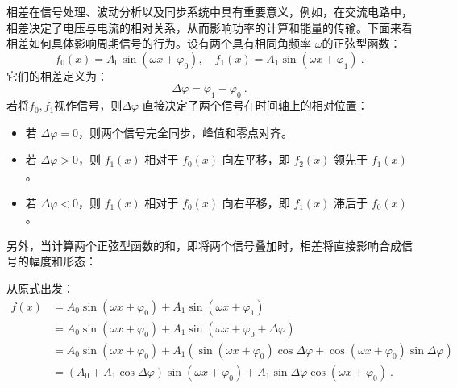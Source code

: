 相差在信号处理、波动分析以及同步系统中具有重要意义，例如，在交流电路中，相差决定了电压与电流的相对关系，从而影响功率的计算和能量的传输。下面来看相差如何具体影响周期信号的行为。设有两个具有相同角频率 $\omega$的正弦型函数：
\begin{equation}
f_0\left(x\right)=A_0\sin\left(\omega x+\varphi_0\right),\quad f_1\left(x\right)=A_1\sin\left(\omega x+\varphi_1\right)~.
\end{equation}
它们的相差定义为：
\begin{equation}
\Delta \varphi = \varphi_1 - \varphi_0~.
\end{equation}
若将$f_0,f_1$视作信号，则$\Delta \varphi$ 直接决定了两个信号在时间轴上的相对位置：
\begin{itemize}
\item 若 $\Delta \varphi = 0$，则两个信号完全同步，峰值和零点对齐。
\item 若 $\Delta \varphi > 0$，则 $f_1(x)$ 相对于 $f_0(x)$ 向左平移，即 $f_2(x)$ 领先于 $f_1(x)$。
\item 若 $\Delta \varphi < 0$，则 $f_1(x)$ 相对于 $f_0(x)$ 向右平移，即 $f_1(x)$ 滞后于 $f_0(x)$。
\end{itemize}

另外，当计算两个正弦型函数的和，即将两个信号叠加时，相差将直接影响合成信号的幅度和形态：

从原式出发：
\begin{equation}
\begin{split}
f(x) &= A_0\sin(\omega x + \varphi_0) + A_1\sin(\omega x + \varphi_1) \\
&= A_0\sin(\omega x + \varphi_0) + A_1\sin(\omega x + \varphi_0 + \Delta \varphi)\\
&= A_0\sin(\omega x + \varphi_0) + A_1 \left( \sin(\omega x + \varphi_0) \cos \Delta \varphi + \cos(\omega x + \varphi_0) \sin \Delta \varphi \right) \\
&= (A_0 + A_1 \cos \Delta \varphi) \sin(\omega x + \varphi_0) + A_1 \sin \Delta \varphi\cos(\omega x + \varphi_0)~.
\end{split}
\end{equation}

